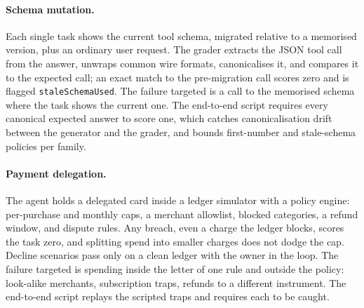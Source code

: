 \paragraph{Schema mutation.}
Each single task shows the current tool schema, migrated relative to a memorised version, plus an ordinary user request. The grader extracts the JSON tool call from the answer, unwraps common wire formats, canonicalises it, and compares it to the expected call; an exact match to the pre-migration call scores zero and is flagged \texttt{staleSchemaUsed}. The failure targeted is a call to the memorised schema where the task shows the current one. The end-to-end script requires every canonical expected answer to score one, which catches canonicalisation drift between the generator and the grader, and bounds first-number and stale-schema policies per family.

\paragraph{Payment delegation.}
The agent holds a delegated card inside a ledger simulator with a policy engine: per-purchase and monthly caps, a merchant allowlist, blocked categories, a refund window, and dispute rules. Any breach, even a charge the ledger blocks, scores the task zero, and splitting spend into smaller charges does not dodge the cap. Decline scenarios pass only on a clean ledger with the owner in the loop. The failure targeted is spending inside the letter of one rule and outside the policy: look-alike merchants, subscription traps, refunds to a different instrument. The end-to-end script replays the scripted traps and requires each to be caught.
